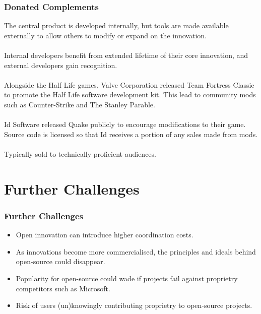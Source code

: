 \documentclass{beamer}
\begin{document}

\begin{frame}
\frametitle{Donated Complements}
The central product is developed internally, but tools are made available externally to allow others to modify or expand on the innovation.\\~\\

Internal developers benefit from extended lifetime of their core innovation, and external developers gain recognition.\\~\\

Alongside the Half Life games, Valve Corporation released Team Fortress Classic to promote the Half Life software development kit. This lead to community mods such as Counter-Strike and The Stanley Parable.\\~\\

Id Software released Quake publicly to encourage modifications to their game. Source code is licensed so that Id receives a portion of any sales made from mods.\\~\\

Typically sold to technically proficient audiences.
\end{frame}

\section{Further Challenges}

\begin{frame}
\frametitle{Further Challenges}
\begin{itemize}
\item Open innovation can introduce higher coordination costs.
\item As innovations become more commercialised, the principles and ideals behind open-source could disappear.
\item Popularity for open-source could wade if projects fail against proprietry competitors such as Microsoft.
\item Risk of users (un)knowingly contributing proprietry to open-source projects.
\end{itemize}
\end{frame}
\end{document}
